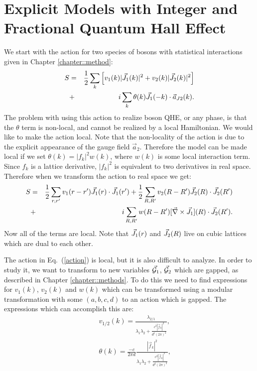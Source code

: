 \section{Explicit Models with Integer and Fractional Quantum Hall Effect}
\label{sec::demon} 

We start with the action for two species of bosons with statistical interactions given in Chapter \ref{chapter::method}:
\begin{eqnarray}
S&=&\frac{1}{2}\sum_k \left[v_1(k)|\vec{J}_1(k)|^2+v_2(k)|\vec{J}_2(k)|^2\right]\nonumber\\
&+&i\sum_k \theta(k)\vec{J}_1(-k)\cdot \vec{a}_{J2}(k).
\label{kaction}
\end{eqnarray}
The problem with using this action to realize boson QHE, or any phase, is that the $\theta$ term is non-local, and cannot be realized by a local Hamiltonian. We would like to make the action local. Note that the non-locality of the action is due to the explicit appearance of the gauge field $\vec{a}_2$. Therefore the model can be made local if we set $\theta(k)=|f_k|^2 w(k)$, where $w(k)$ is some local interaction term. Since $f_k$ is a lattice derivative, $|f_k|^2$ is equivalent to two derivatives in real space. Therefore when we transform the action to real space we get:
\begin{eqnarray}
S&=&\frac{1}{2} \sum_{r,r'} v_1(r-r')\vec{J}_1(r)\cdot\vec{J}_1(r')
+\frac{1}{2}\sum_{R,R'} v_2(R-R')\vec{J}_2(R)\cdot\vec{J}_2(R')\nonumber\\
&+&i\sum_{R,R'}  w(R-R')[\vec{\nabla}\times\vec{J}_1](R)\cdot\vec{J}_2(R').
\label{action}
\end{eqnarray}
Now all of the terms are local. Note that $\vec{J}_1(r)$ and $\vec{J}_2(R)$ live on cubic lattices which are dual to each other. 

The action in Eq.~(\ref{action}) is local, but it is also difficult to analyze. In order to study it, we want to transform to new variables $\vec{\mathcal{G}}_1$, $\vec{\mathcal{G}}_2$ which are gapped, as described in Chapter \ref{chapter::methods}. To do this we need to find expressions for $v_1(k)$, $v_2(k)$ and $w(k)$ which can be transformed using a modular transformation with some $(a,b,c,d)$ to an action which is gapped. The expressions which can accomplish this are: 
\begin{eqnarray}
&&v_{1/2}(k)=\frac{\lambda_{2/1}}{\lambda_1\lambda_2+\frac{c^2|\vec{f}_k|^2}{d^2(2\pi)^2}}, \label{vintro}\\
&&\theta(k)=\frac{-c}{2\pi d}\frac{|\vec{f}_k|^2}{\lambda_1\lambda_2+\frac{c^2|\vec{f}_k|^2}{d^2(2\pi)^2}},\label{tintro}
\end{eqnarray}

